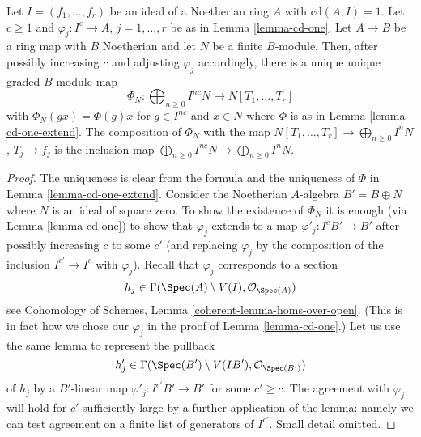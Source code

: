 \begin{lemma}
\label{lemma-cd-one-extend-to-module}
Let $I = (f_1, \ldots, f_r)$ be an ideal of a Noetherian ring $A$
with $\text{cd}(A, I) = 1$. Let $c \geq 1$ and $\varphi_j : I^c \to A$,
$j = 1, \ldots, r$ be as in Lemma \ref{lemma-cd-one}.
Let $A \to B$ be a ring map with $B$ Noetherian and let $N$ be
a finite $B$-module. Then, after possibly increasing $c$
and adjusting $\varphi_j$ accordingly, there is a unique
unique graded $B$-module map
$$
\Phi_N : \bigoplus\nolimits_{n \geq 0} I^{nc}N \to N[T_1, \ldots, T_r]
$$
with $\Phi_N(g x) = \Phi(g) x$ for $g \in I^{nc}$ and $x \in N$
where $\Phi$ is as in Lemma \ref{lemma-cd-one-extend}.
The composition of $\Phi_N$ with the map
$N[T_1, \ldots, T_r] \to \bigoplus_{n \geq 0} I^nN$,
$T_j \mapsto f_j$ is the inclusion map
$\bigoplus_{n \geq 0} I^{nc}N \to \bigoplus_{n \geq 0} I^nN$.
\end{lemma}

\begin{proof}
The uniqueness is clear from the formula and the uniqueness of $\Phi$ in
Lemma \ref{lemma-cd-one-extend}. Consider the Noetherian $A$-algebra
$B' = B \oplus N$ where $N$ is an ideal of square zero. To show
the existence of $\Phi_N$ it is enough
(via Lemma \ref{lemma-cd-one}) to show that $\varphi_j$ extends to
a map $\varphi'_j : I^cB' \to B'$ after possibly increasing $c$
to some $c'$ (and replacing $\varphi_j$ by the composition of the inclusion
$I^{c'} \to I^c$ with $\varphi_j$). Recall that $\varphi_j$ corresponds to a
section
$$
h_j \in \Gamma(\Spec(A) \setminus V(I), \mathcal{O}_{\Spec(A)})
$$
see Cohomology of Schemes, Lemma \ref{coherent-lemma-homs-over-open}.
(This is in fact how we chose our $\varphi_j$ in the proof of
Lemma \ref{lemma-cd-one}.) Let us use the same lemma to represent the pullback
$$
h'_j \in \Gamma(\Spec(B') \setminus V(IB'), \mathcal{O}_{\Spec(B')})
$$
of $h_j$ by a $B'$-linear map
$\varphi'_j : I^{c'}B' \to B'$ for some $c' \geq c$.
The agreement with $\varphi_j$ will hold for $c'$
sufficiently large by a further application of the lemma:
namely we can test agreement on a finite list of generators of $I^{c'}$.
Small detail omitted.
\end{proof}

